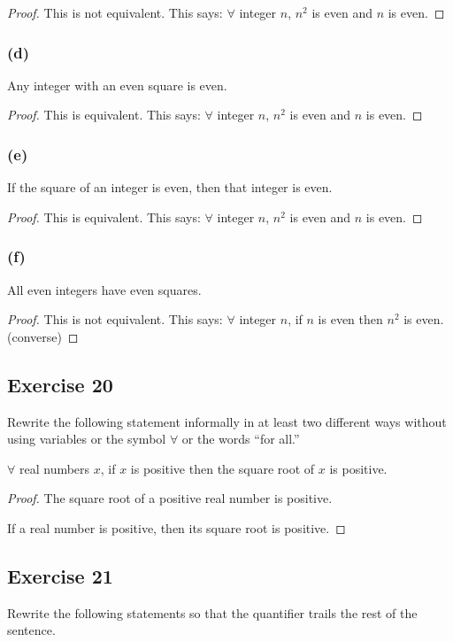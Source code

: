 \documentclass[14pt]{extarticle}
\newcommand{\fa}{\forall}
\begin{document}
\begin{proof}
This is not equivalent. This says: $\fa$ integer $n$, $n^2$ is even and $n$ is even.
\end{proof}

\subsubsection{(d)}
Any integer with an even square is even.

\begin{proof}
This is equivalent. This says: $\fa$ integer $n$, $n^2$ is even and $n$ is even.
\end{proof}

\subsubsection{(e)}
If the square of an integer is even, then that integer is even.

\begin{proof}
This is equivalent. This says: $\fa$ integer $n$, $n^2$ is even and $n$ is even.
\end{proof}

\subsubsection{(f)}
All even integers have even squares.

\begin{proof}
This is not equivalent. This says: $\fa$ integer $n$, if $n$ is even then $n^2$ is even. (converse)
\end{proof}

\subsection{Exercise 20}
Rewrite the following statement informally in at least two different ways without using variables or the symbol $\fa$ or the words “for all.”

$\fa$ real numbers $x$, if $x$ is positive then the square root of $x$ is positive.

\begin{proof}
The square root of a positive real number is positive.

If a real number is positive, then its square root is positive.
\end{proof}

\subsection{Exercise 21}
Rewrite the following statements so that the quantifier trails the rest of the sentence.
\end{document}
